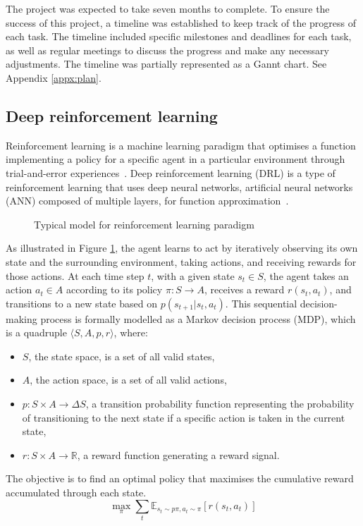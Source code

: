 The project was expected to take seven months to complete. To ensure the success of this project, a timeline was established to keep track of the progress of each task. The timeline included specific milestones and deadlines for each task, as well as regular meetings to discuss the progress and make any necessary adjustments. The timeline was partially represented as a Gannt chart. See Appendix \ref{appx:plan}.



\subsection{Deep reinforcement learning} \label{subsec:drl}

Reinforcement learning is a machine learning paradigm that optimises a function implementing a policy for a specific agent in a particular environment through trial-and-error experiences~\cite{ref:spinning-up}. Deep reinforcement learning (DRL) is a type of reinforcement learning that uses deep neural networks, artificial neural networks (ANN) composed of multiple layers, for function approximation~\cite{ref:dqn}.

\begin{figure}[htbp]
\centering

\caption{Typical model for reinforcement learning paradigm \cite{ref:spec-report}}
\label{fig:agent-env-interaction}
\end{figure}

As illustrated in Figure \ref{fig:agent-env-interaction}, the agent learns to act by iteratively observing its own state and the surrounding environment, taking actions, and receiving rewards for those actions. At each time step $t$, with a given state $s_t \in S$, the agent takes an action $a_t \in A$ according to its policy $\pi \colon S \to A$, receives a reward $r(s_t, a_t)$, and transitions to a new state based on $p(s_{t+1}|s_t, a_t)$. This sequential decision-making process is formally modelled as a Markov decision process (MDP), which is a quadruple $\langle S, A, p, r \rangle$, where:
\begin{itemize}
\item $S$, the state space, is a set of all valid states,
\item $A$, the action space, is a set of all valid actions,
\item $p \colon S \times A \to \Delta S$, a transition probability function representing the probability of transitioning to the next state if a specific action is taken in the current state,
\item $r \colon S \times A \to \mathbb{R}$, a reward function generating a reward signal.
\end{itemize}
The objective is to find an optimal policy that maximises the cumulative reward accumulated through each state.
\begin{displaymath}
\max_{\pi} \sum_{t} \mathbb{E}_{s_t \sim p\pi, a_t \sim \pi} \left[ r(s_t,a_t) \right]
\end{displaymath}

